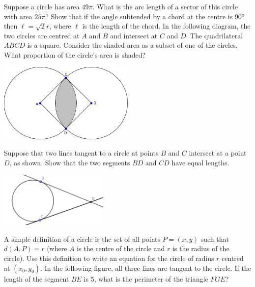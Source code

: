\begin{questions}
  \question Suppose a circle has area $ 49\pi $. What is the arc length of a sector of this circle with area $ 25\pi $?
  \question Show that if the angle subtended by a chord at the centre is \ang{90} then $ \ell = \sqrt{2}r $, where $ \ell $
            is the length of the chord.
  \question In the following diagram, the two circles are centred at $ A $ and $ B $ and intersect at $ C $ and $ D $. The
            quadrilateral $ ABCD $ is a square. Consider the shaded area as a subset of one of the circles. What proportion
            of the circle's area is shaded?
            \begin{center}
              \includegraphics[width=0.5\textwidth]{overlapcircle}
            \end{center}
  \question Suppose that two lines tangent to a circle at points $ B $ and $ C $ intersect at a point $ D $, as shown. Show that
            the two segments $ BD $ and $ CD $ have equal lengths. \label{exercise:tangents}
            \begin{center}
              \includegraphics[width=0.4\textwidth]{cirtangents}
            \end{center}
  \question A simple definition of a circle is the set of all points $ P = (x,y) $ such that $ d(A, P) = r $ (where $ A $ is the centre of the circle
            and $ r $ is the radius of the circle). Use this definition to write an equation for the circle of radius $ r $ centred at $ (x_0,y_0) $.
  \clearpage
  \question In the following figure, all three lines are tangent to the circle. If the length of the segment $BE$ is 5, what is the perimeter of the triangle $FGE$?

\end{questions}
